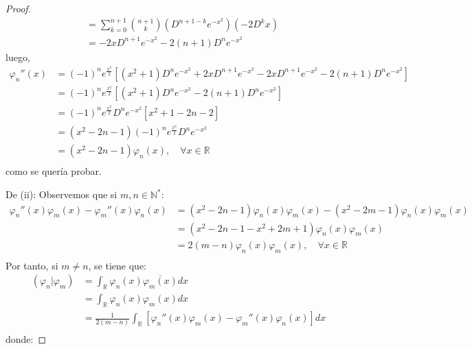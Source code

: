 \documentclass[12pt]{report}
\theoremstyle{largebreak}
\newcommand\pint[2]{\ensuremath{\left(#1\big|#2\right)}}
\newcommand\conj[1]{\ensuremath{\overline{#1}}}
\begin{document}
\begin{proof}
\begin{equation*}
\begin{split}
                &=\sum_{ k=0}^{n+1} \binom{n +1}{k} (D^{n+1-k}e^{-x^2})(-2D^k x)\\
                &=-2xD^{n+1}e^{-x^2}-2(n+1)D^{n}e^{-x^2}
            \end{split}
        \end{equation*}
        luego,
        \begin{equation*}
            \begin{split}
                \varphi_n''(x)&=(-1)^ne^{\frac{x^2}{2}}\left[(x^2+1)D^ne^{-x^2}+2xD^{n+1}e^{-x^2}-2xD^{n+1}e^{-x^2}-2(n+1)D^ne^{-x^2} \right]\\
                &=(-1)^ne^{\frac{x^2}{2}}\left[(x^2+1)D^ne^{-x^2}-2(n+1)D^ne^{-x^2} \right]\\
                &=(-1)^ne^{\frac{x^2}{2}}D^ne^{-x^2} \left[x^2+1-2n-2 \right]\\
                &=(x^2-2n-1)(-1)^ne^{\frac{x^2}{2}}D^ne^{-x^2}\\
                &=(x^2-2n-1)\varphi_n(x),\quad\forall x\in\mathbb{R}\\ 
            \end{split}
        \end{equation*}
        como se quería probar.

        De (ii): Observemos que si $m,n\in\mathbb{N}^*$:
        \begin{equation*}
            \begin{split}
                \varphi_n''(x)\varphi_m(x)-\varphi_m''(x)\varphi_n(x)&=(x^2-2n-1)\varphi_n(x)\varphi_m(x)-(x^2-2m-1)\varphi_n(x)\varphi_m(x) \\
                &=(x^2-2n-1-x^2+2m+1)\varphi_n(x)\varphi_m(x) \\ 
                &=2(m-n)\varphi_n(x)\varphi_m(x),\quad\forall x\in\mathbb{R} \\ 
            \end{split}
        \end{equation*}
        Por tanto, si $m\neq n$, se tiene que:
        \begin{equation*}
            \begin{split}
                \pint{\varphi_n}{\varphi_m}&=\int_{\mathbb{R}}\varphi_n(x)\conj{\varphi_m(x)}dx\\
                &=\int_{\mathbb{R}}\varphi_n(x)\varphi_m(x)dx\\
                &=\frac{1}{2(m-n)} \int_{\mathbb{R}}\left[\varphi_n''(x)\varphi_m(x)-\varphi_m''(x)\varphi_n(x)\right]dx\\
            \end{split}
        \end{equation*}
        donde:

    \end{proof}
\end{document}
